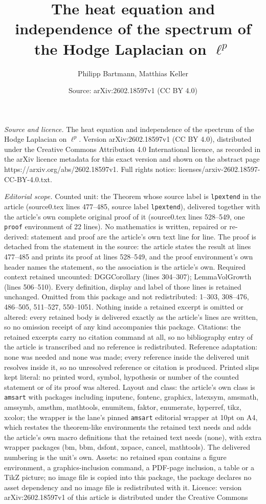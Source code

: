 \documentclass[10pt,a4paper]{amsart}
\title[The heat equation and independence of the spectrum of the Ho]{The heat equation and independence of the spectrum of the Hodge Laplacian on $\ell^p$}
\author{Philipp Bartmann, Matthias Keller}
\date{Source: arXiv:2602.18597v1 (CC BY 4.0)}
\begin{document}
\maketitle

\noindent\emph{Source and licence.} The heat equation and independence of the spectrum of the Hodge Laplacian on $\ell^p$. Version arXiv:2602.18597v1 (CC BY 4.0), distributed under the Creative Commons Attribution 4.0 International licence, as recorded in the arXiv licence metadata for this exact version and shown on the abstract page https://arxiv.org/abs/2602.18597v1. Full rights notice: licenses/arxiv-2602.18597-CC-BY-4.0.txt.\par\smallskip

\noindent\textit{Editorial scope.} Counted unit: the Theorem whose source label is \texttt{lpextend} in the article (source0.tex lines 477--485, source label \texttt{lpextend}), delivered together with the article's own complete original proof of it (source0.tex lines 528--549, one \texttt{proof} environment of 22 lines). No mathematics is written, repaired or re-derived: statement and proof are the article's own text line for line. The proof is detached from the statement in the source: the article states the result at lines 477--485 and prints its proof at lines 528--549, and the proof environment's own header names the statement, so the association is the article's own. Required context retained uncounted: DGGCorollary (lines 304--307); LemmaVolGrowth (lines 506--510). Every definition, display and label of those lines is retained unchanged. Omitted from this package and not redistributed: 1--303, 308--476, 486--505, 511--527, 550--1051. Nothing inside a retained excerpt is omitted or altered: every retained body is delivered exactly as the article's lines are written, so no omission receipt of any kind accompanies this package. Citations: the retained excerpts carry no citation command at all, so no bibliography entry of the article is transcribed and no reference is redistributed. Reference adaptation: none was needed and none was made; every reference inside the delivered unit resolves inside it, so no unresolved reference or citation is produced. Printed slips kept literal: no printed word, symbol, hypothesis or number of the counted statement or of its proof was altered. Layout and class: the article's own class is \texttt{amsart} with packages including inputenc, fontenc, graphicx, latexsym, amsmath, amssymb, amsthm, mathtools, enumitem, faktor, enumerate, hyperref, tikz, xcolor; the wrapper is the lane's pinned \texttt{amsart} editorial wrapper at 10pt on A4, which restates the theorem-like environments the retained text needs and adds the article's own macro definitions that the retained text needs (none), with extra wrapper packages (bm, bbm, dsfont, xspace, cancel, mathtools). The delivered numbering is the unit's own. Assets: no retained span contains a figure environment, a graphics-inclusion command, a PDF-page inclusion, a table or a TikZ picture; no image file is copied into this package, the package declares no asset dependency and no image file is redistributed with it. Licence: version arXiv:2602.18597v1 of this article is distributed under the Creative Commons 
\end{document}
